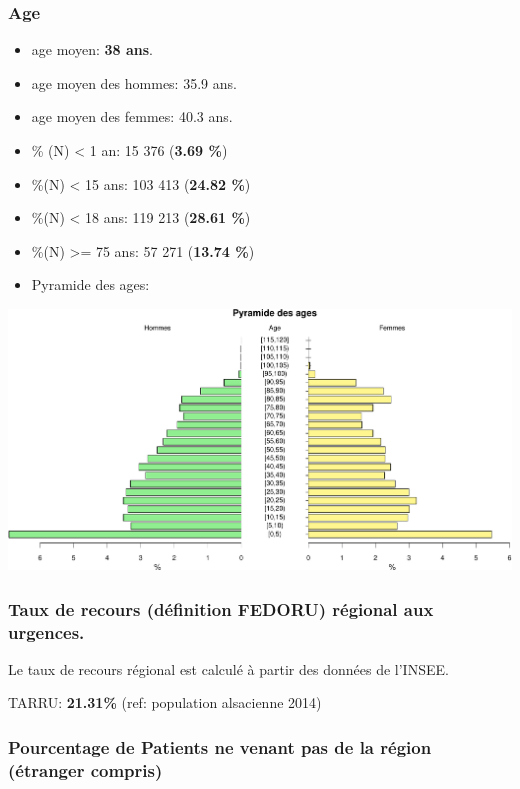 \documentclass[]{article}
\begin{document}
\subsubsection{Age}\label{age}

\begin{itemize}
\item
  age moyen: \textbf{38 ans}.
\item
  age moyen des hommes: 35.9 ans.
\item
  age moyen des femmes: 40.3 ans.
\item
  \% (N) \textless{} 1 an: 15 376 (\textbf{3.69 \%})
\item
  \%(N) \textless{} 15 ans: 103 413 (\textbf{24.82 \%})
\item
  \%(N) \textless{} 18 ans: 119 213 (\textbf{28.61 \%})
\item
  \%(N) \textgreater{}= 75 ans: 57 271 (\textbf{13.74 \%})
\item
  Pyramide des ages:
\end{itemize}

\includegraphics{Figs/pyramide-1.pdf}

\subsubsection{Taux de recours (définition FEDORU) régional aux
urgences.}\label{taux-de-recours-definition-fedoru-regional-aux-urgences.}

Le taux de recours régional est calculé à partir des données de l'INSEE.

TARRU: \textbf{21.31\%} (ref: population alsacienne 2014)

\subsubsection{Pourcentage de Patients ne venant pas de la région
(étranger
compris)}\label{pourcentage-de-patients-ne-venant-pas-de-la-region-etranger-compris}
\end{document}
